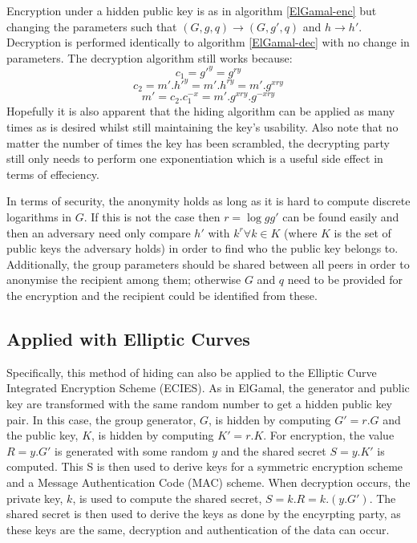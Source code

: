 \documentclass[ %
                    author={Luke Murray},
                supervisor={Dr. Simon Hollis},
                     title={Shadow Peer-to-Peer Networks},
                  subtitle={},
                    degree={MEng},
                      year={2013} ]{thesis}
\begin{document}
Encryption under a hidden public key is as in algorithm \ref{ElGamal-enc} but changing the parameters such that $(G, g, q) \rightarrow (G, g\prime, q)$ and $h \rightarrow h\prime$. Decryption is performed identically to algorithm \ref{ElGamal-dec} with no change in parameters. The decryption algorithm still works because:
\[c_1 = g\prime^{y} = g^{ry}\]
\[c_2 = m\prime.h\prime^{y} = m\prime.h^{ry} = m\prime.g^{xry}\]
\[m\prime = c_2.c_1^{-x} = m\prime.g^{xry}.g^{-xry}\]
Hopefully it is also apparent that the hiding algorithm can be applied as many times as is desired whilst still maintaining the key's usability. Also note that no matter the number of times the key has been scrambled, the decrypting party still only needs to perform one exponentiation which is a useful side effect in terms of effeciency. 

In terms of security, the anonymity holds as long as it is hard to compute discrete logarithms in $G$. If this is not the case then $r = \log{g}g\prime$ can be found easily and then an adversary need only compare $h\prime$ with $k^{r} \forall k \in K$ (where $K$ is the set of public keys the adversary holds) in order to find who the public key belongs to. Additionally, the group parameters should be shared between all peers in order to anonymise the recipient among them; otherwise $G$ and $q$ need to be provided for the encryption and the recipient could be identified from these.

\subsection{Applied with Elliptic Curves}

Specifically, this method of hiding can also be applied to the Elliptic Curve Integrated Encryption Scheme (ECIES)\cite{ECIES}. As in ElGamal, the generator and public key are transformed with the same random number to get a hidden public key pair. In this case, the group generator, $G$, is hidden by computing $G\prime = r.G$ and the public key, $K$, is hidden by computing $K\prime = r.K$. For encryption, the value $R = y.G\prime$ is generated with some random $y$ and the shared secret $S = y.K\prime$ is computed. This S is then used to derive keys for a symmetric encryption scheme and a Message Authentication Code (MAC) scheme. When decryption occurs, the private key, $k$, is used to compute the shared secret, $S = k.R = k.(y.G\prime)$. The shared secret is then used to derive the keys as done by the encyrpting party, as these keys are the same, decryption and authentication of the data can occur.
\end{document}
